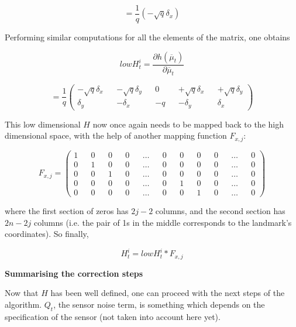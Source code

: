 \documentclass[a4paper]{article}
\begin{document}
\begin{equation*}
    = \frac{1}{q} (- \sqrt{q} \delta_x)
\end{equation*}

Performing similar computations for all the elements of the matrix, one obtains

\begin{equation*}
    low H_t^i = 
    \frac{\partial h (\overline{\mu}_t)} {\partial \overline{\mu}_t}
\end{equation*}

\begin{equation*}
    = \frac{1}{q} 
    \begin{pmatrix}
        -\sqrt{q} \delta_x && -\sqrt{q} \delta_y && 0 && +\sqrt{q} \delta_x && +\sqrt{q} \delta_y
        \\
        \delta_y && -\delta_x && -q && -\delta_y && \delta_x
    \end{pmatrix}
\end{equation*}

This low dimensional $H$ now once again needs to be mapped back to the high dimensional space, with the help of another mapping function $F_{x,j}$:

\begin{equation*}
    F_{x,j} = 
    \begin{pmatrix}
        1 && 0 && 0 && 0 && \hdots && 0 && 0 && 0 && 0 && \hdots && 0
        \\
        0 && 1 && 0 && 0 && \hdots && 0 && 0 && 0 && 0 && \hdots && 0
        \\
        0 && 0 && 1 && 0 && \hdots && 0 && 0 && 0 && 0 && \hdots && 0
        \\
        0 && 0 && 0 && 0 && \hdots && 0 && 1 && 0 && 0 && \hdots && 0
        \\
        0 && 0 && 0 && 0 && \hdots && 0 && 0 && 1 && 0 && \hdots && 0
    \end{pmatrix}
\end{equation*}

where the first section of zeros has $2j-2$ columns, and the second section has $2n-2j$ columns (i.e. the pair of 1s in the middle corresponds to the landmark's coordinates). So finally,

\begin{equation*}
    H_t^i = low H_t^i * F_{x,j}
\end{equation*}

\textbf{Summarising the correction steps}

Now that $H$ has been well defined, one can proceed with the next steps of the algorithm. $Q_t$, the sensor noise term, is something which depends on the specification of the sensor (not taken into account here yet).
\end{document}
